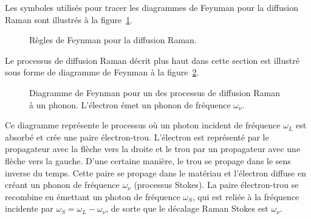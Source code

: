Les symboles utilisés pour tracer les diagrammes de Feynman pour la diffusion Raman sont illustrés à la figure~\ref{fig:règles_Raman}.
\begin{figure}[htbp]
    \centering
    
    \caption[Règles de Feynman pour la diffusion Raman.]{Règles de Feynman pour la diffusion Raman.}
    \label{fig:règles_Raman}
\end{figure}

\noindent Le processus de diffusion Raman décrit plus haut dans cette section est illustré sous forme de diagramme de Feynman à la figure~\ref{fig:e1}.
\begin{figure}[htbp]
    \centering
    
    \caption[Diagramme de Feynman pour un des processus de diffusion Raman à un phonon.]{Diagramme de Feynman pour un des processus de diffusion Raman à un phonon. L'électron émet un phonon de fréquence $\omega_\nu$.} 
    \label{fig:e1}
\end{figure}
Ce diagramme représente le processus où un photon incident de fréquence $\omega_L$ est absorbé et crée une paire électron-trou. L'électron est représenté par le propagateur avec la flèche vers la droite et le trou par un propagateur avec une flèche vers la gauche. D'une certaine manière, le trou se propage dans le sens inverse du temps. Cette paire se propage dans le matériau et l'électron diffuse en créant un phonon de fréquence $\omega_\nu$ (processus Stokes). La paire électron-trou se recombine en émettant un photon de fréquence $\omega_S$, qui est reliée à la fréquence incidente par $\omega_S = \omega_L - \omega_\nu$, de sorte que le décalage Raman Stokes est $\omega_\nu$.


